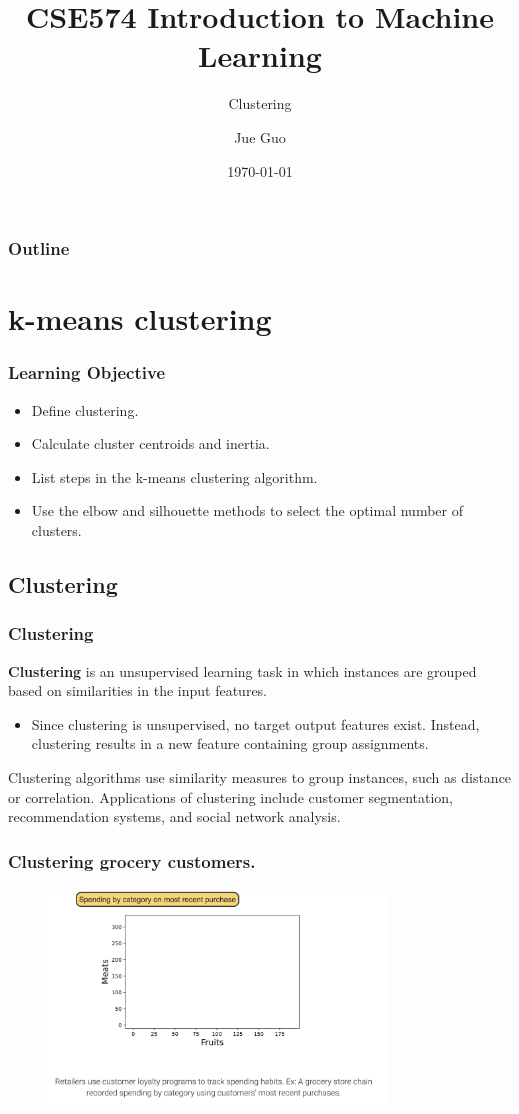\documentclass[10pt,dvipsnames]{beamer}
\title{CSE574 Introduction to Machine Learning}
\subtitle{Clustering}
\author{Jue Guo}
\institute{University at Buffalo}
\date{\today}
\begin{document}
\begin{frame}
    \titlepage
\end{frame}
\begin{frame}
    \frametitle{Outline}
    \tableofcontents
\end{frame}

\section{k-means clustering}
\begin{frame}
    \frametitle{Learning Objective}
    \begin{itemize}
        \item Define clustering.
        \item Calculate cluster centroids and inertia.
        \item List steps in the k-means clustering algorithm.
        \item Use the elbow and silhouette methods to select the optimal number of clusters.
    \end{itemize}
\end{frame}

\subsection{Clustering}
\begin{frame}
    \frametitle{Clustering}
    \textbf{Clustering} is an unsupervised learning task in which instances are grouped based on similarities in the input features.
    \begin{itemize}
        \item Since clustering is unsupervised, no target output features exist. Instead, clustering results in a new feature containing group assignments.
    \end{itemize}
    Clustering algorithms use similarity measures to group instances, such as distance or correlation. Applications of clustering include customer segmentation, recommendation systems, and social network analysis.
\end{frame}

\begin{frame}
    \frametitle{Clustering grocery customers.}
    \begin{figure}[ht]
        \centering
        \includegraphics[width=0.8\textwidth]{imgs/k_mean_1.png}
    \end{figure}
\end{frame}
\end{document}
